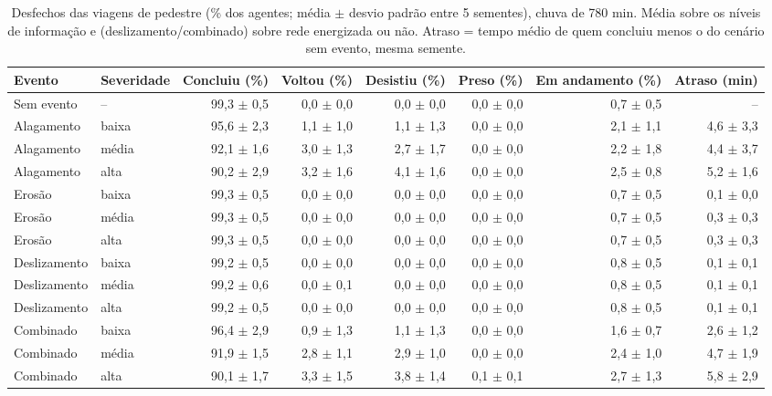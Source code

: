 \begin{table}[htbp]
\centering
\scriptsize
\caption{Desfechos das viagens de pedestre (\% dos agentes; média $\pm$ desvio padrão entre 5 sementes), chuva de 780 min. Média sobre os níveis de informação e (deslizamento/combinado) sobre rede energizada ou não. Atraso = tempo médio de quem concluiu menos o do cenário sem evento, mesma semente.}
\label{tab:t1_780_pedestre}
\begin{tabular}{llrrrrrr}
\toprule
Evento & Severidade & Concluiu (\%) & Voltou (\%) & Desistiu (\%) & Preso (\%) & Em andamento (\%) & Atraso (min) \\
\midrule
Sem evento & -- & 99,3 $\pm$ 0,5 & 0,0 $\pm$ 0,0 & 0,0 $\pm$ 0,0 & 0,0 $\pm$ 0,0 & 0,7 $\pm$ 0,5 & -- \\
Alagamento & baixa & 95,6 $\pm$ 2,3 & 1,1 $\pm$ 1,0 & 1,1 $\pm$ 1,3 & 0,0 $\pm$ 0,0 & 2,1 $\pm$ 1,1 & 4,6 $\pm$ 3,3 \\
Alagamento & média & 92,1 $\pm$ 1,6 & 3,0 $\pm$ 1,3 & 2,7 $\pm$ 1,7 & 0,0 $\pm$ 0,0 & 2,2 $\pm$ 1,8 & 4,4 $\pm$ 3,7 \\
Alagamento & alta & 90,2 $\pm$ 2,9 & 3,2 $\pm$ 1,6 & 4,1 $\pm$ 1,6 & 0,0 $\pm$ 0,0 & 2,5 $\pm$ 0,8 & 5,2 $\pm$ 1,6 \\
Erosão & baixa & 99,3 $\pm$ 0,5 & 0,0 $\pm$ 0,0 & 0,0 $\pm$ 0,0 & 0,0 $\pm$ 0,0 & 0,7 $\pm$ 0,5 & 0,1 $\pm$ 0,0 \\
Erosão & média & 99,3 $\pm$ 0,5 & 0,0 $\pm$ 0,0 & 0,0 $\pm$ 0,0 & 0,0 $\pm$ 0,0 & 0,7 $\pm$ 0,5 & 0,3 $\pm$ 0,3 \\
Erosão & alta & 99,3 $\pm$ 0,5 & 0,0 $\pm$ 0,0 & 0,0 $\pm$ 0,0 & 0,0 $\pm$ 0,0 & 0,7 $\pm$ 0,5 & 0,3 $\pm$ 0,3 \\
Deslizamento & baixa & 99,2 $\pm$ 0,5 & 0,0 $\pm$ 0,0 & 0,0 $\pm$ 0,0 & 0,0 $\pm$ 0,0 & 0,8 $\pm$ 0,5 & 0,1 $\pm$ 0,1 \\
Deslizamento & média & 99,2 $\pm$ 0,6 & 0,0 $\pm$ 0,1 & 0,0 $\pm$ 0,0 & 0,0 $\pm$ 0,0 & 0,8 $\pm$ 0,5 & 0,1 $\pm$ 0,1 \\
Deslizamento & alta & 99,2 $\pm$ 0,5 & 0,0 $\pm$ 0,0 & 0,0 $\pm$ 0,0 & 0,0 $\pm$ 0,0 & 0,8 $\pm$ 0,5 & 0,1 $\pm$ 0,1 \\
Combinado & baixa & 96,4 $\pm$ 2,9 & 0,9 $\pm$ 1,3 & 1,1 $\pm$ 1,3 & 0,0 $\pm$ 0,0 & 1,6 $\pm$ 0,7 & 2,6 $\pm$ 1,2 \\
Combinado & média & 91,9 $\pm$ 1,5 & 2,8 $\pm$ 1,1 & 2,9 $\pm$ 1,0 & 0,0 $\pm$ 0,0 & 2,4 $\pm$ 1,0 & 4,7 $\pm$ 1,9 \\
Combinado & alta & 90,1 $\pm$ 1,7 & 3,3 $\pm$ 1,5 & 3,8 $\pm$ 1,4 & 0,1 $\pm$ 0,1 & 2,7 $\pm$ 1,3 & 5,8 $\pm$ 2,9 \\
\bottomrule
\end{tabular}
\end{table}
